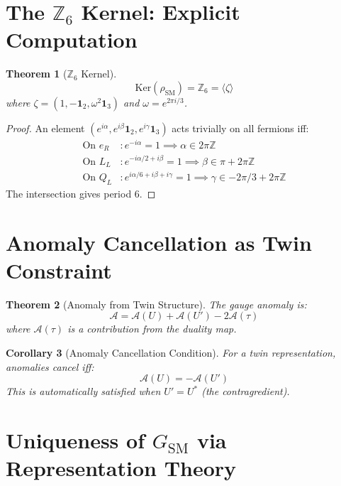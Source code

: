 \documentclass[11pt,a4paper,openright]{book}
\theoremstyle{plain}
\newtheorem{theorem}{Theorem}[chapter]
\newtheorem{corollary}[theorem]{Corollary}
\theoremstyle{definition}
\newcommand{\SM}{\mathrm{SM}}
\newcommand{\Ker}{\mathrm{Ker}}
\newcommand{\Z}{\mathbb{Z}}
\begin{document}
\section{The $\Z_6$ Kernel: Explicit Computation}

\begin{theorem}[$\Z_6$ Kernel]
\begin{equation}
\Ker(\rho_{\SM}) = \Z_6 = \langle \zeta \rangle
\end{equation}
where $\zeta = (1, -\mathbf{1}_2, \omega^2 \mathbf{1}_3)$ and $\omega = e^{2\pi i/3}$.
\end{theorem}

\begin{proof}
An element $(e^{i\alpha}, e^{i\beta}\mathbf{1}_2, e^{i\gamma}\mathbf{1}_3)$ acts trivially on all fermions iff:
\begin{align}
\text{On } e_R &: e^{-i\alpha} = 1 \implies \alpha \in 2\pi\Z \\
\text{On } L_L &: e^{-i\alpha/2 + i\beta} = 1 \implies \beta \in \pi + 2\pi\Z \\
\text{On } Q_L &: e^{i\alpha/6 + i\beta + i\gamma} = 1 \implies \gamma \in -2\pi/3 + 2\pi\Z
\end{align}
The intersection gives period 6.
\end{proof}

\section{Anomaly Cancellation as Twin Constraint}

\begin{theorem}[Anomaly from Twin Structure]
The gauge anomaly is:
\begin{equation}
\mathcal{A} = \mathcal{A}(U) + \mathcal{A}(U') - 2\mathcal{A}(\tau)
\end{equation}
where $\mathcal{A}(\tau)$ is a contribution from the duality map.
\end{theorem}

\begin{corollary}[Anomaly Cancellation Condition]
For a twin representation, anomalies cancel iff:
\begin{equation}
\mathcal{A}(U) = -\mathcal{A}(U')
\end{equation}
This is automatically satisfied when $U' = U^*$ (the contragredient).
\end{corollary}

\section{Uniqueness of $G_{\SM}$ via Representation Theory}
\end{document}
